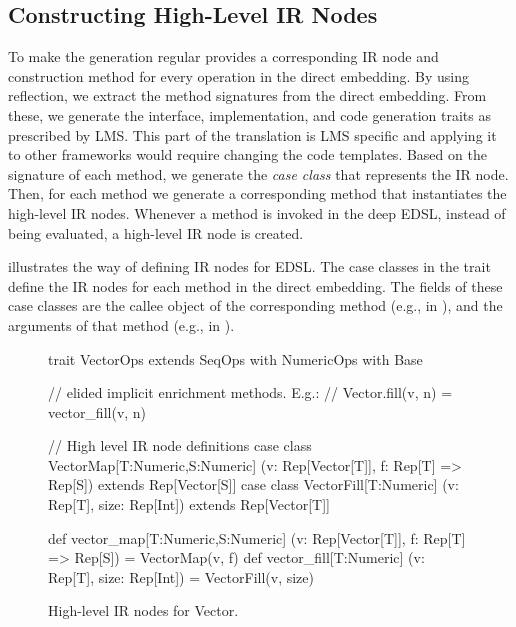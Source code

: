 \subsection{Constructing High-Level IR Nodes}
\label{sec:yy-impl-def}

To make the generation regular \yy provides a corresponding IR node and
construction method for every operation in the direct embedding. By using
reflection, we extract the method signatures from the direct embedding. From
these, we generate the interface, implementation, and code generation traits as
prescribed by LMS. This part of the translation is LMS specific and applying it
to other frameworks would require changing the code templates. Based on the
signature of each method, we generate the \emph{case class} that represents the
IR node. Then, for each method we generate a corresponding method that
instantiates the high-level IR nodes. Whenever a method is invoked in the deep
EDSL, instead of being evaluated, a high-level IR node is created.

 illustrates the way of defining IR nodes for
 EDSL. The case classes in the  trait define the
IR nodes for each method in the direct embedding. The fields of these case
classes are the callee object of the corresponding method (e.g.,  in
), and the arguments of that method (e.g.,  in
).

\begin{figure}
\begin{listingtiny}
trait VectorOps extends SeqOps with
  NumericOps with Base {
  // elided implicit enrichment methods. E.g.:
  //   Vector.fill(v, n) = vector_fill(v, n)

  // High level IR node definitions
  case class VectorMap[T:Numeric,S:Numeric]
    (v: Rep[Vector[T]], f: Rep[T] => Rep[S])
    extends Rep[Vector[S]]
  case class VectorFill[T:Numeric]
    (v: Rep[T], size: Rep[Int])
    extends Rep[Vector[T]]

  def vector_map[T:Numeric,S:Numeric]
    (v: Rep[Vector[T]], f: Rep[T] => Rep[S]) =
      VectorMap(v, f)
  def vector_fill[T:Numeric]
    (v: Rep[T], size: Rep[Int]) =
    VectorFill(v, size)
}
\end{listingtiny}
\caption{\label{lst:vector_deep_ir} High-level IR nodes for Vector.}
\end{figure}


